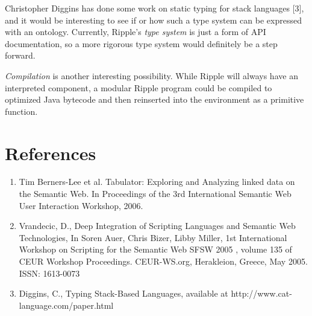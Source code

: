 \documentclass[runningheads]{llncs}
\begin{document}
Christopher Diggins has done some work on static typing for stack languages [3], and it would be interesting to see if or how such a type system can be expressed with an ontology.  Currently, Ripple's \textit{type system} is just a form of API documentation, so a more rigorous type system would definitely be a step forward.

\textit{Compilation} is another interesting possibility.  While Ripple will always have an interpreted component, a modular Ripple program could be compiled to optimized Java bytecode and then reinserted into the environment as a primitive function.

\section*{References}
\begin{enumerate}
\item Tim Berners-Lee et al. Tabulator: Exploring and Analyzing linked data on the Semantic Web. In Proceedings of the 3rd International Semantic Web User Interaction Workshop, 2006.
\item Vrandecic, D., Deep Integration of Scripting Languages and Semantic Web Technologies, In Soren Auer, Chris Bizer, Libby Miller, 1st International Workshop on Scripting for the Semantic Web SFSW 2005 , volume 135 of CEUR Workshop Proceedings. CEUR-WS.org, Herakleion, Greece, May 2005. ISSN: 1613-0073
\item Diggins, C., Typing Stack-Based Languages, available at http://www.cat-language.com/paper.html
\end{enumerate}
\end{document}
